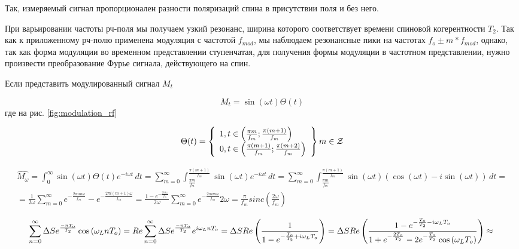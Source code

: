 \documentclass[a4paper,12pt]{article}
\begin{document}
Так, измеряемый сигнал пропорционален разности поляризаций спина в присутствии поля и без него.

При варьировании частоты рч-поля мы получаем узкий резонанс, ширина которого соответствует времени спиновой когерентности $T_2$. Так как к приложенному рч-полю применена модуляция с частотой $f_{mod}$, мы наблюдаем резонансные пики на частотах $f_o \pm m*f_{mod}$, однако, так как форма модуляции во временном представлении ступенчатая, для получения формы модуляции в частотном представлении, нужно произвести преобразование Фурье сигнала, действующего на спин. 

Если представить модулированный сигнал $M_t$

$$M_t = \sin\left( {\omega t}\right) \Theta\left( t\right) $$
где на рис. \ref{fig:modulation_rf}

$$
\Theta (t) = \left\{
\begin{array}
[c]{ll}%
1, t \in \left( \frac{\pi m}{f_m} ; \frac{\pi \left( m + 1 \right) }{f_m} \right) \\
0, t \in \left( \frac{\pi \left( m + 1 \right) }{f_m} ; \frac{\pi \left( m + 2 \right) }{f_m} \right)
\end{array}
\right\}
m \in \mathcal{Z} 
$$

\begin{eqnarray}\label{fourier}
\hat{M_{\omega}} = \int_{0}^{\infty} \sin\left( {\omega t}\right) \Theta\left( t\right) e^{-i \omega t}\,dt = \sum_{m = 0}^{\infty}\int_{\frac{\pi m}{f_m}}^{\frac{\pi \left( m + 1 \right) }{f_m}} \sin\left( {\omega t}\right) e^{-i \omega t}\,dt = \sum_{m = 0}^{\infty}\int_{\frac{\pi m}{f_m}}^{\frac{\pi \left( m + 1 \right) }{f_m}} \sin\left( {\omega t}\right) \left( \cos\left( {\omega t}\right) - i \sin\left( {\omega t}\right)\right)\,dt = \\ = \frac{1}{2 \omega} \sum_{m = 0}^{\infty} e^{- \frac{2 \pi i m \omega}{f_m}} - e^{- \frac{2 \pi i \left( m + 1\right)  \omega}{f_m}} = \frac{ 1 - e^{-\frac{2 \pi i \omega}{f_m}} }{2 \omega} \sum_{m = 0}^{\infty} e^{-\frac{2 \pi i m  \omega}{f_m}}{2 \omega} = \frac{\pi}{f_m} sinc\left( \frac{2 \omega}{f_m} \right)
\end{eqnarray}

\begin{equation}\label{sum}
\sum_{n = 0}^{\infty} \Delta S e^{\frac{-n T_o}{T_2}} \cos{\left( \omega_L n T_o \right) } = Re \sum_{n=0}^{\infty} \Delta S e^{\frac{-n T_o}{T_2}} e^{i \omega_L n T_o} = \Delta S Re\left( \frac{1}{1 - e^{- \frac{T_o}{T_2} + i \omega_L T_o}} \right) = \Delta S Re \left( \frac{1 - e^{- \frac{T_o}{T_2} - i \omega_L T_o}}{1 + e^{-\frac{2 T_o}{T_2}} - 2 e^{-\frac{T_o}{T_2}} \cos{\left( \omega_L T_o \right) }} \right) \approx \\
\end{equation}
\end{document}
